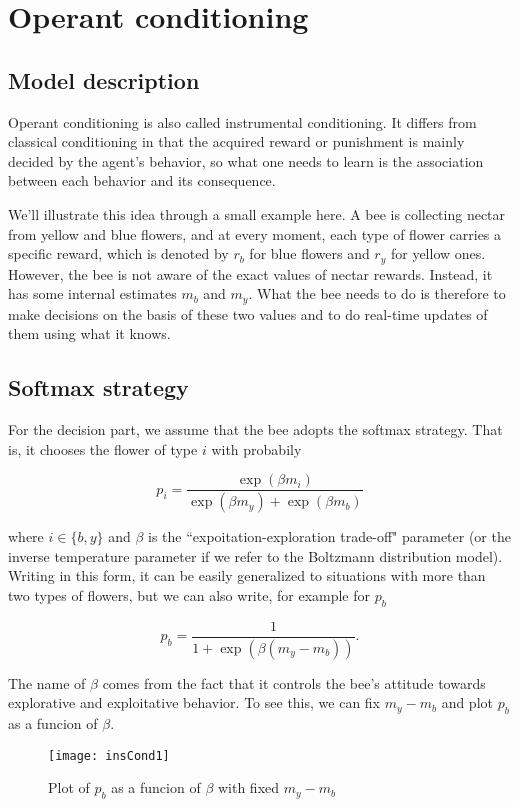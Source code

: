 \section{Operant conditioning}

\subsection{Model description}

Operant conditioning is also called instrumental conditioning. It differs from
classical conditioning in that the acquired reward or punishment is mainly
decided by the agent's behavior, so what one needs to learn is the association
between each behavior and its consequence.

We'll illustrate this idea through a small example here. A bee is collecting
nectar from yellow and blue flowers, and at every moment, each type of 
flower carries a specific reward, which is denoted by $r_b$ for blue flowers
and $r_y$ for yellow ones. However, the bee is not aware of the exact values
of nectar rewards. Instead, it has some internal estimates $m_b$ and 
$m_y$. What the bee needs to do is therefore to make decisions on the basis
of these two values and to do real-time updates of them using what it knows.

\subsection{Softmax strategy}

For the decision part, we assume that the bee adopts the softmax strategy.
That is, it chooses the flower of type $i$ with probabily 

\[p_i = \frac{\exp(\beta m_i)}{\exp(\beta m_y) + \exp(\beta m_b)}\]

\noindent
where $i \in \{b, y\}$ and $\beta$ is the ``expoitation-exploration
trade-off" parameter (or the inverse temperature parameter if we refer to
the Boltzmann distribution model). Writing in this form, it can be easily
generalized to situations with more than two types of flowers, but we can also
write, for example for $p_b$

\[p_b = \frac{1}{1 + \exp(\beta(m_y - m_b))}.\]

The name of $\beta$ comes from the fact that it controls the bee's attitude
towards explorative and exploitative behavior. To see this, we can fix 
$m_y - m_b$ and plot $p_b$ as a funcion of $\beta$.

\vspace{-1em}
\begin{figure}[H]
  \centering
  \texttt{[image: insCond1]}
  \caption {Plot of $p_b$ as a funcion of $\beta$ with fixed $m_y-m_b$}
\end{figure}

